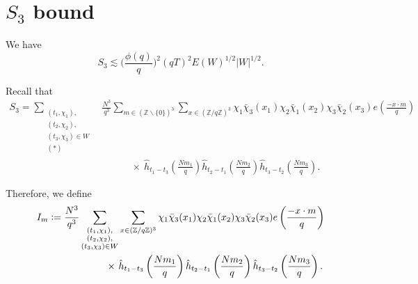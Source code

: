 \section{$S_3$ bound}\label{s_3chapter}
\begin{proposition}\label{s_3bound}
    We have \[
    S_3 \lesssim \Big(\frac{\phi(q)}{q}\Big)^2 (qT)^2 E( W)^{1/2} | W|^{1/2}.
    \]
\end{proposition}
Recall that 
\begin{align*}
S_3 = \sum_{\substack{(t_1,\chi_1),\\(t_2,\chi_2),\\(t_3,\chi_3)\in W \\ (*)}}&
\frac{N^3}{q^3}\sum_{m\in(\mathbb{Z}\backslash \{0\})^3}\sum_{x\in (\mathbb{Z}/q\mathbb{Z})^3}\chi_1\bar{\chi}_3(x_1)\chi_2\bar{\chi}_1(x_2)\chi_3\bar{\chi}_2(x_3) e\left(\frac{-x\cdot m}{q}\right)\\
& \quad \quad \quad \times \ \hat{h}_{t_1-t_3}\left(\frac{Nm_1}{q}\right)\hat{h}_{t_2-t_1}\left(\frac{Nm_2}{q}\right)\hat{h}_{t_3-t_2}\left(\frac{Nm_3}{q}\right).
\end{align*}

Therefore, we define 
\begin{align*}
	I_m\defeq\frac{N^3}{q^3}\sum_{\substack{(t_1,\chi_1),\\(t_2,\chi_2),\\(t_3,\chi_3)\in W}} &\sum_{x\in (\mathbb{Z}/q\mathbb{Z})^3}\chi_1\bar{\chi}_3(x_1)\chi_2\bar{\chi}_1(x_2)\chi_3\bar{\chi}_2(x_3) e\left(\frac{-x\cdot m}{q}\right)\\
	\times \ &\hat{h}_{t_1-t_3}\left(\frac{Nm_1}{q}\right)\hat{h}_{t_2-t_1}\left(\frac{Nm_2}{q}\right)\hat{h}_{t_3-t_2}\left(\frac{Nm_3}{q}\right).
\end{align*}


